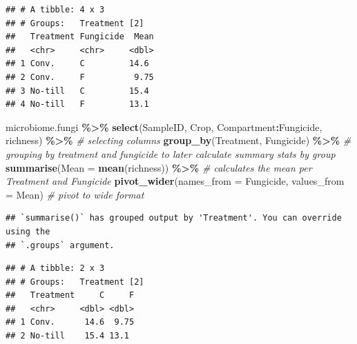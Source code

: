 \documentclass[
]{article}
\newenvironment{Shaded}{\begin{snugshade}}{\end{snugshade}}
\newcommand{\AttributeTok}[1]{\textcolor[rgb]{0.13,0.29,0.53}{#1}}
\newcommand{\CommentTok}[1]{\textcolor[rgb]{0.56,0.35,0.01}{\textit{#1}}}
\newcommand{\FunctionTok}[1]{\textcolor[rgb]{0.13,0.29,0.53}{\textbf{#1}}}
\newcommand{\NormalTok}[1]{#1}
\newcommand{\SpecialCharTok}[1]{\textcolor[rgb]{0.81,0.36,0.00}{\textbf{#1}}}
\begin{document}
\begin{verbatim}
## # A tibble: 4 x 3
## # Groups:   Treatment [2]
##   Treatment Fungicide  Mean
##   <chr>     <chr>     <dbl>
## 1 Conv.     C         14.6 
## 2 Conv.     F          9.75
## 3 No-till   C         15.4 
## 4 No-till   F         13.1
\end{verbatim}

\begin{Shaded}
\begin{Highlighting}[]
\NormalTok{microbiome.fungi }\SpecialCharTok{\%\textgreater{}\%}
  \FunctionTok{select}\NormalTok{(SampleID, Crop, Compartment}\SpecialCharTok{:}\NormalTok{Fungicide, richness) }\SpecialCharTok{\%\textgreater{}\%} \CommentTok{\# selecting columns  }
  \FunctionTok{group\_by}\NormalTok{(Treatment, Fungicide) }\SpecialCharTok{\%\textgreater{}\%} \CommentTok{\# grouping by treatment and fungicide to later calculate summary stats by group}
  \FunctionTok{summarise}\NormalTok{(}\AttributeTok{Mean =} \FunctionTok{mean}\NormalTok{(richness)) }\SpecialCharTok{\%\textgreater{}\%} \CommentTok{\# calculates the mean per Treatment and Fungicide }
  \FunctionTok{pivot\_wider}\NormalTok{(}\AttributeTok{names\_from =}\NormalTok{ Fungicide, }\AttributeTok{values\_from =}\NormalTok{ Mean) }\CommentTok{\# pivot to wide format}
\end{Highlighting}
\end{Shaded}

\begin{verbatim}
## `summarise()` has grouped output by 'Treatment'. You can override using the
## `.groups` argument.
\end{verbatim}

\begin{verbatim}
## # A tibble: 2 x 3
## # Groups:   Treatment [2]
##   Treatment     C     F
##   <chr>     <dbl> <dbl>
## 1 Conv.      14.6  9.75
## 2 No-till    15.4 13.1
\end{verbatim}
\end{document}
